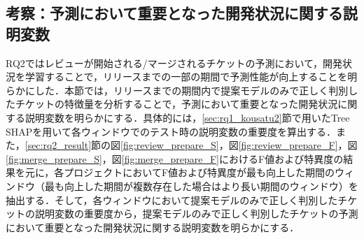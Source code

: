 \documentclass[submit]{ipsj}
\begin{document}


\subsection{考察：予測において重要となった開発状況に関する説明変数}\label{sec:rq2_kousatu}
RQ2ではレビューが開始される/マージされるチケットの予測において，開発状況を学習することで，リリースまでの一部の期間で予測性能が向上することを明らかにした．本節では，リリースまでの期間内で提案モデルのみで正しく判別したチケットの特徴量を分析することで，予測において重要となった開発状況に関する説明変数を明らかにする．具体的には，\ref{sec:rq1_kousatu2}節で用いたTree SHAPを用いて各ウィンドウでのテスト時の説明変数の重要度を算出する．また，\ref{sec:rq2_result}節の図\ref{fig:review_prepare_S}，図\ref{fig:review_prepare_F}，図\ref{fig:merge_prepare_S}，図\ref{fig:merge_prepare_F}におけるF値および特異度の結果を元に，各プロジェクトにおいてF値および特異度が最も向上した期間のウィンドウ（最も向上した期間が複数存在した場合はより長い期間のウィンドウ）を抽出する．そして，各ウィンドウにおいて提案モデルのみで正しく判別したチケットの説明変数の重要度から，提案モデルのみで正しく判別したチケットの予測において重要となった開発状況に関する説明変数を明らかにする．
\end{document}
